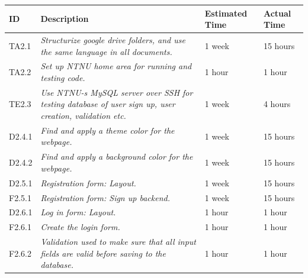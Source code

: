 \begin{minipage}{\linewidth}
\setlength{\tabcolsep}{12pt}
\centering
{}
\begin{tabular}{|p{1cm}|p{4cm}|p{2cm}|p{2cm}|}
\hline
\cellcolor{gray!25} ID & \cellcolor{gray!25} Description & \cellcolor{gray!25} Estimated Time & \cellcolor{gray!25} Actual Time \\
\hline
TA2.1 & \it{Structurize google drive folders, and use the same language in all documents.} & 1 week & 15 hours \\
TA2.2 & \it{Set up NTNU home area for running and testing code.} & 1 hour & 1 hour \\
TE2.3 & \it{Use NTNU-s MySQL server over SSH for testing database of user sign up, user creation, validation etc. } & 1 week & 4 hours \\
D2.4.1 & \it{Find and apply a theme color for the webpage. } & 1 week & 15 hours \\
D2.4.2 & \it{Find and apply a background color for the webpage.} & 1 week & 15 hours \\
D2.5.1 & \it{Registration form: Layout.} & 1 week & 15 hours \\
F2.5.1 & \it{Registration form: Sign up backend.} & 1 week & 15 hours \\
D2.6.1 & \it{Log in form: Layout.} & 1 hour & 1 hour \\
F2.6.1 & \it{Create the login form.} & 1 hour & 1 hour \\
F2.6.2 & \it{Validation used to make sure that all input fields are valid before saving to the database. } & 1 hour & 1 hour \\
\hline
\end{tabular}
\end{minipage}


